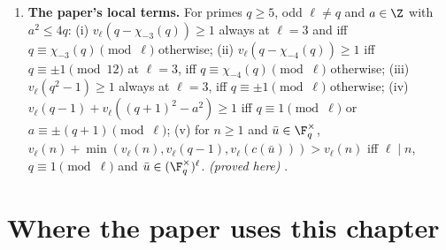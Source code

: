 \begin{enumerate}[label=\textbf{\thechapter.\arabic*}]
\emph{(proved here)} .
\item \textbf{The paper's local terms.} For primes $q\ge5$, odd $\ell\ne q$ and $a\in\Z$ with $a^2\le4q$: (i) $v_\ell(q-\chi_{-3}(q))\ge1$ always at $\ell=3$ and
iff $q\equiv\chi_{-3}(q)\pmod\ell$ otherwise; (ii) $v_\ell(q-\chi_{-4}(q))\ge1$ iff $q\equiv\pm1\pmod{12}$ at $\ell=3$, iff $q\equiv\chi_{-4}(q)\pmod\ell$ otherwise;
(iii) $v_\ell(q^2-1)\ge1$ always at $\ell=3$, iff $q\equiv\pm1\pmod\ell$ otherwise; (iv) $v_\ell(q-1)+v_\ell((q+1)^2-a^2)\ge1$ iff $q\equiv1\pmod\ell$ or
$a\equiv\pm(q+1)\pmod\ell$; (v) for $n\ge1$ and $\bar u\in\F_q^\times$, $v_\ell(n)+\min(v_\ell(n),v_\ell(q-1),v_\ell(c(\bar u)))>v_\ell(n)$ iff $\ell\mid n$, $q\equiv1\pmod\ell$
and $\bar u\in(\F_q^\times)^\ell$. \emph{(proved here)} .
\end{enumerate}

\section*{Where the paper uses this chapter}

